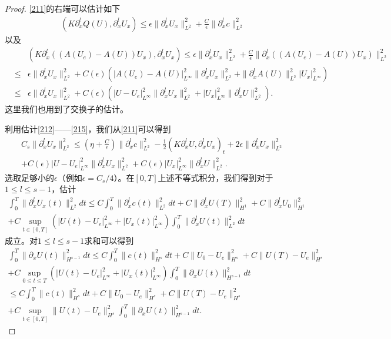 \begin{proof}
\eqref{211}的右端可以估计如下
\begin{eqnarray}\label{214}
  (K \partial^l_x Q(U),\partial^l_x U_x) \le \epsilon \|\partial^l_x U_x\|_{L^2}^2 + \frac{C}{\epsilon} \|\partial^l_x c\|_{L^2}^2
\end{eqnarray}
以及
\begin{eqnarray}\label{215}
  && (K\partial^l_x ((A(U_e)-A(U))U_x),\partial^l_x U_x) \le \epsilon\|\partial^l_x U_x\|_{L^2}^2 + \frac{C}{\epsilon} \|\partial^l_x( (A(U_e)-A(U))U_x)\|_{L^2}^2 \nonumber \\
  &\le& \epsilon \|\partial^l_x U_x \|_{L^2}^2 + C(\epsilon)( |A(U_e)-A(U )|_{L^\infty}^2 \|\partial^l_x U_x\|^2_{L^2}+\|\partial^l_x A(U)\|_{L^2}^2|U_x|_{L^\infty}^2) \nonumber \\
  &\le& \epsilon \|\partial^l_x U_x\|_{L^2}^2 + C(\epsilon) (|U-U_e|_{L^\infty}^2 \|\partial^l_x U_x\|_{L^2}^2 + |U_x|_{L^\infty}^2 \|\partial^l_x U\|_{L^2}^2).
\end{eqnarray}
这里我们也用到了交换子的估计。

利用估计\eqref{212}——\eqref{215}，我们从\eqref{211}可以得到
\begin{multline*}
  C_s \|\partial^l_x U_x\|^2_{L^2} \le (\eta+\frac{C}{\epsilon}) \|\partial^l_x c\|_{L^2}^2-\frac{1}{2} (K \partial^l_x U,\partial^l_x U_x)_t  + 2\epsilon \|\partial^l_x U_x\|^2_{L^2} \\
  +C(\epsilon) |U-U_e|_{L^\infty}^2 \|\partial^l_x U_x\|_{L^2}^2 + C(\epsilon) |U_x|_{L^\infty}^2 \|\partial^l_x U\|_{L^2}^2.
\end{multline*}
选取足够小的$\epsilon$（例如$\epsilon = C_s/4$）。在$[0,T]$上述不等式积分，我们得到对于$1\le l \le s-1$，估计
\begin{multline*}
  \int_0^T \|\partial^l_x U_x(t)\|^2_{L^2} dt \le C \int_0^T \|\partial^l_x c(t)\|^2_{L^2} dt
  +C\|\partial^l_x U(T)\|_{H^1}^2 + C\|\partial^l_x U_0\|_{H^1}^2 \\
  + C \sup_{t\in [0,T]} (|U(t)-U_e|_{L^\infty}^2 + |U_x(t)|_{L^\infty}^2) \int_0^T \|\partial^l_x U(t)\|_{L^2}^2 dt
\end{multline*}
成立。对$1 \le l \le s-1$求和可以得到
\begin{multline}\label{216}
  \int_0^T \|\partial_x U(t)\|^2_{H^{s-1}} dt \le C \int_0^T \|c(t)\|^2_{H^s} dt + C\|U_0-U_e\|^2_{H^s} + C\|U(T)-U_e\|^2_{H^s} \\+C \sup_{0 \le t \le T}(|U(t)-U_e|_{L^\infty}^2 + |U_x(t)|_{L^\infty}^2) \int_0^T \|\partial_x U(t)\|_{H^{s-1}}^2 dt \\
  \le C \int_0^T \|c(t)\|_{H^s}^2 dt + C \|U_0-U_e\|_{H^s}^2 + C\|U(T) -U_e\|_{H^s}^2  \\ + C \sup_{t \in [0,T] }\|U(t)-U_e\|_{H^s}^2 \int_0^T \|\partial_x U(t)\|_{H^{s-1}}^2 dt.
\end{multline}


\end{proof}
